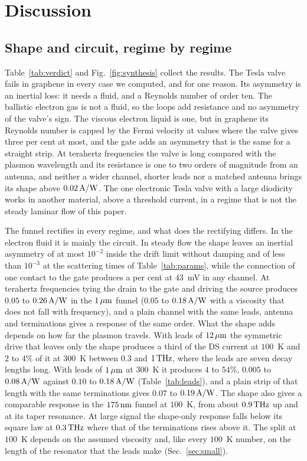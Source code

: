 \section{Discussion}
\label{sec:discussion}

\subsection{Shape and circuit, regime by regime}

Table~\ref{tab:verdict} and Fig.~\ref{fig:synthesis} collect the results.
The Tesla valve fails in graphene in every case we computed, and for one
reason. Its
asymmetry is an inertial loss: it needs a fluid, and a Reynolds number of
order ten. The ballistic electron gas is not a fluid, so the loops add
resistance and no asymmetry of the valve's sign. The viscous electron
liquid is one, but in graphene its
Reynolds number is capped by the Fermi velocity at values where the valve
gives three per cent at most, and the gate adds an asymmetry that is the
same for a straight strip. At terahertz frequencies the valve is long compared
with the plasmon wavelength and its resistance is one to two orders of
magnitude from an antenna, and neither a wider channel, shorter leads
nor a matched antenna brings its shape above $0.02\,\mathrm{A/W}$. The one electronic Tesla valve with a large
diodicity~\cite{sarypov2026electron} works in another material, above a
threshold current, in a regime that is not the steady laminar flow of this
paper.

The funnel rectifies in every regime, and what does the rectifying differs.
In the electron fluid it is mainly the circuit. In steady flow the shape
leaves an inertial asymmetry of at most $10^{-2}$ inside the drift limit
without damping and of less than $10^{-3}$ at the scattering times of
Table~\ref{tab:params},
while the connection of one contact to the gate
produces a per cent at $43$~mV in any channel. At terahertz frequencies
tying the
drain to the gate and driving the source produces $0.05$ to $0.26\,\mathrm{A/W}$ in the
$1\,\mu\mathrm{m}$ funnel ($0.05$ to $0.18\,\mathrm{A/W}$ with a viscosity that does not fall
with frequency), and a plain channel with the same leads, antenna and
terminations gives a response of the same order. What the shape adds
depends on how far the plasmon travels. With leads of $12\,\mu\mathrm{m}$ the
symmetric drive that leaves only the shape produces a third of the DS
current at $100$~K and $2$ to $4\%$ of it at $300$~K between $0.3$ and
$1\,\mathrm{THz}$, where the leads are seven decay lengths long. With leads of
$1\,\mu\mathrm{m}$ at $300$~K it produces $4$ to $54\%$, $0.005$ to $0.08\,\mathrm{A/W}$
against $0.10$ to $0.18\,\mathrm{A/W}$ (Table~\ref{tab:leads}), and a plain strip of
that length with the same terminations gives $0.07$ to $0.19\,\mathrm{A/W}$. The
shape also gives a comparable response in the $175\,\mathrm{nm}$ funnel at
$100$~K, from about $0.9\,\mathrm{THz}$ up and at its taper resonance. At large
signal the shape-only response falls below its square law at $0.3\,\mathrm{THz}$
where that of the terminations rises above it. The split at $100$~K
depends on the assumed viscosity and, like every $100$~K number, on the
length of the resonator that the leads make (Sec.~\ref{sec:small}).

